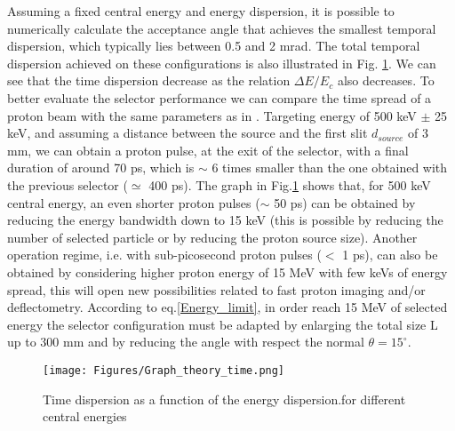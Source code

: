 \documentclass{cup-hpl}
\begin{document}
Assuming a fixed central energy and energy dispersion, it is possible to  numerically calculate the acceptance angle that achieves the smallest temporal dispersion, which typically lies between 0.5 and 2 mrad. The total temporal dispersion achieved on these configurations is also illustrated in Fig. \ref{Graphs theory time}. We can see that the time dispersion decrease as the relation $\Delta E / E_c$ also decreases. To better evaluate the selector performance we can compare the time spread of a proton beam with the same parameters as in \cite{api21}. Targeting energy of 500 keV $\pm$ 25 keV, and assuming a distance between the source and the first slit $d_{source}$ of 3 mm, we can obtain a proton pulse, at the exit of the selector, with a final duration of around 70 ps, which is $\sim$ 6 times smaller than the one obtained with the previous selector ($ \simeq $ 400 ps). The graph in Fig.\ref{Graphs theory time} shows that, for 500 keV central energy, an even shorter proton pulses ($\sim $ 50 ps) can be obtained by reducing the energy bandwidth down to 15 keV (this is possible by reducing the number of selected particle or by reducing the proton source size). Another operation regime, i.e. with sub-picosecond proton pulses ($ <$ 1 ps), can also be obtained by  considering higher proton energy of 15 MeV with few keVs of energy spread, this will open new possibilities related to fast proton imaging and/or deflectometry. According to eq.\ref{Energy_limit}, in order reach 15 MeV of selected energy the selector configuration must be adapted by enlarging the total size L up to 300 mm and by reducing the angle with respect the normal $\theta=15^\circ$.
\begin{figure}[t]
	\centering
		\texttt{[image: Figures/Graph\_theory\_time.png]}%
	\caption{Time dispersion as a function of the  energy dispersion.for different central energies}
\label{Graphs theory time}
\end{figure}
\end{document}
